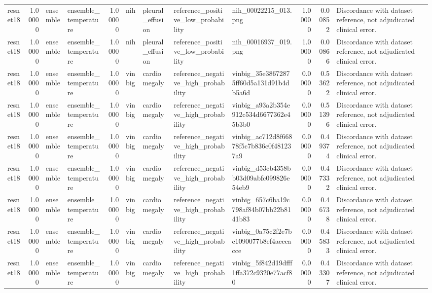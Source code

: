\begin{tabular}{lrllrllllrrl}
resnet18 & 1.00000 & ensemble & ensemble\_temperature & 1.00000 & nih & pleural\_effusion & reference\_positive\_low\_probability & nih\_00022215\_013.png & 1.00000 & 0.00852 & Discordance with dataset reference, not adjudicated clinical error. \\
resnet18 & 1.00000 & ensemble & ensemble\_temperature & 1.00000 & nih & pleural\_effusion & reference\_positive\_low\_probability & nih\_00016937\_019.png & 1.00000 & 0.00866 & Discordance with dataset reference, not adjudicated clinical error. \\
resnet18 & 1.00000 & ensemble & ensemble\_temperature & 1.00000 & vinbig & cardiomegaly & reference\_negative\_high\_probability & vinbig\_35e38672875ff60d5a131d91b4db5a6d & 0.00000 & 0.53622 & Discordance with dataset reference, not adjudicated clinical error. \\
resnet18 & 1.00000 & ensemble & ensemble\_temperature & 1.00000 & vinbig & cardiomegaly & reference\_negative\_high\_probability & vinbig\_a93a2b354e912c534d6677362e45b3b0 & 0.00000 & 0.51396 & Discordance with dataset reference, not adjudicated clinical error. \\
resnet18 & 1.00000 & ensemble & ensemble\_temperature & 1.00000 & vinbig & cardiomegaly & reference\_negative\_high\_probability & vinbig\_ac712d8f66878f5c7b836c0f481237a9 & 0.00000 & 0.49374 & Discordance with dataset reference, not adjudicated clinical error. \\
resnet18 & 1.00000 & ensemble & ensemble\_temperature & 1.00000 & vinbig & cardiomegaly & reference\_negative\_high\_probability & vinbig\_d53cb4358bb03d09abfc099826e54eb9 & 0.00000 & 0.47332 & Discordance with dataset reference, not adjudicated clinical error. \\
resnet18 & 1.00000 & ensemble & ensemble\_temperature & 1.00000 & vinbig & cardiomegaly & reference\_negative\_high\_probability & vinbig\_657c6ba19c798af84b07bb22b8141b83 & 0.00000 & 0.46738 & Discordance with dataset reference, not adjudicated clinical error. \\
resnet18 & 1.00000 & ensemble & ensemble\_temperature & 1.00000 & vinbig & cardiomegaly & reference\_negative\_high\_probability & vinbig\_0a75c2f2e7bc1090077b8ef4aeeeacce & 0.00000 & 0.45833 & Discordance with dataset reference, not adjudicated clinical error. \\
resnet18 & 1.00000 & ensemble & ensemble\_temperature & 1.00000 & vinbig & cardiomegaly & reference\_negative\_high\_probability & vinbig\_5f842d19dfff1ffa372c9320e77acf80 & 0.00000 & 0.43307 & Discordance with dataset reference, not adjudicated clinical error. \\

\end{tabular}
